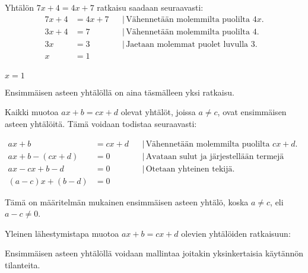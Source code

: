 \begin{esimerkki}
Yhtälön $7x+4=4x+7$ ratkaisu saadaan seuraavasti:
\begin{align*}
7x+4 &= 4x+7 & &| \, \text{Vähennetään molemmilta puolilta $4x$.} \\
3x+4 &= 7 & &| \, \text{Vähennetään molemmilta puolilta 4.} \\
3x &= 3 & &| \, \text{Jaetaan molemmat puolet luvulla 3.} \\
x &= 1 & & \\
\end{align*}

\begin{esimvast} $x=1$
\end{esimvast}
\end{esimerkki}


Ensimmäisen asteen yhtälöllä on aina täsmälleen yksi ratkaisu.

Kaikki muotoa $ax+b=cx+d$ olevat yhtälöt, joissa $a \neq c$, ovat ensimmäisen asteen yhtälöitä. Tämä voidaan todistaa seuraavasti:

\begin{align*}
ax+b &= cx+d & &| \, \text{Vähennetään molemmilta puolilta $cx+d$}. \\
ax+b - (cx+d) &= 0 & &| \, \text{Avataan sulut ja järjestellään termejä uudelleen.} \\
ax - cx + b - d &= 0 & &| \, \text{Otetaan yhteinen tekijä.} \\
(a-c)x + (b-d) &= 0 & &
\end{align*}

Tämä on määritelmän mukainen ensimmäisen asteen yhtälö, koska $a \neq c$, eli $a-c \neq 0$.

\begin{esimerkki}
Yleinen lähestymistapa muotoa $ax+b = cx+d$ olevien yhtälöiden ratkaisuun:
\end{esimerkki}

Ensimmäisen asteen yhtälöllä voidaan mallintaa joitakin yksinkertaisia käytännön tilanteita. 

